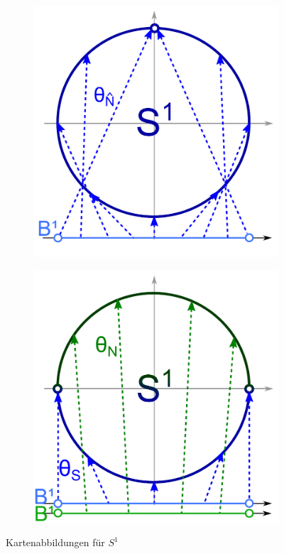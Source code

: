 \begin{figure}[h]
         \centering
         \begin{subfigure}[b]{0.3\textwidth}
                 \includegraphics[width=\textwidth]{Bilder/keine-ueberdeckung.pdf}
                 \caption{}
         \end{subfigure}%
 			\qquad\qquad
         \begin{subfigure}[b]{0.3\textwidth}
                 \includegraphics[width=\textwidth]{Bilder/ohne-aequator.pdf}
                 \caption{}
         \end{subfigure}
         \caption{Kartenabbildungen für $S^1$}
\end{figure}

